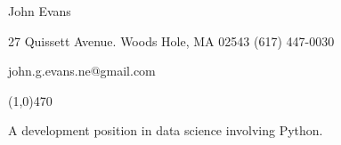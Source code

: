 \documentclass[11pt]{article}  %
\begin{document}
 

\centerline{{\Huge \sc John Evans}  } 

\centerline{27 Quissett Avenue.
            \textbullet \hspace{5pt} Woods Hole, MA  02543
            \textbullet \hspace{5pt}  (617) 447-0030} 
\centerline{john.g.evans.ne@gmail.com} 
\noindent
\line(1,0){470}  \\


\smallskip

\noindent
A development position in data science involving Python.\medskip
\end{document}
